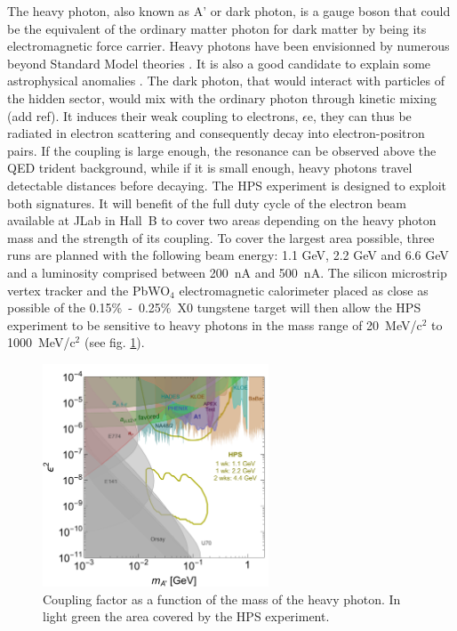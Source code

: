 \documentclass[review]{elsarticle}
\begin{document}
The heavy photon, also known as A' or dark photon, is a gauge boson that 
could be the equivalent of the ordinary matter photon for dark matter by 
being its electromagnetic force carrier. Heavy photons have been 
envisionned by numerous beyond Standard Model theories \cite{REssig}. It 
is also a good candidate to explain some astrophysical anomalies 
\cite{OAdriani-MAguilar}. The dark photon, that would interact with 
particles of the hidden sector, would mix with the ordinary photon through 
kinetic mixing \cite{} (add ref). It induces their weak 
coupling to electrons, $\epsilon$e, they can thus be radiated in electron 
scattering and consequently decay into electron-positron pairs. If the 
coupling is large enough, the resonance can be observed above the QED 
trident background, while if it is small enough, heavy photons travel 
detectable distances before decaying. The HPS experiment is designed to 
exploit both signatures. It will benefit of the full duty cycle of the 
electron beam available at JLab in Hall~B to cover two areas depending on 
the heavy photon mass and the strength of its coupling. To cover the 
largest area possible, three runs are planned with the following beam 
energy: 1.1 GeV, 2.2 GeV and 6.6 GeV and a luminosity comprised between 
200~nA and 500~nA. The silicon microstrip vertex tracker and the 
PbWO$_{4}$ electromagnetic calorimeter placed as close as possible of the 
0.15\%~-~0.25\%~X0 tungstene target will then allow the HPS experiment to 
be sensitive to heavy photons in the mass range of 20~MeV/c$^2$ to 
1000~MeV/c$^2$ (see fig. \ref{intro:covereddomain}). 

\nopagebreak
\begin{figure}[htb]
  \begin{center}
     \includegraphics[angle=0, width=0.6\textwidth]
                           {A-visible-HPS-official-6-2015.pdf}
    \caption{Coupling factor as a function of the mass of the heavy 
     photon. In light green the area covered by the HPS experiment.}
    \label{intro:covereddomain}
  \end{center}
\end{figure}
\end{document}
